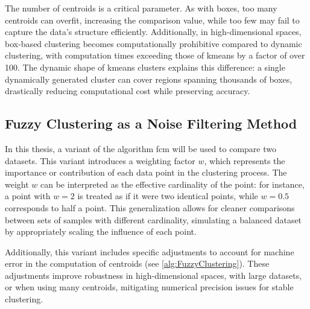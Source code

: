 \begin{toReview}
\begin{exempli_gratia}
	\noindent The number of centroids is a critical parameter. As with boxes, too many centroids can overfit, increasing the comparison value, while too few may fail to capture the data's structure efficiently. Additionally, in high-dimensional spaces, box-based clustering becomes computationally prohibitive compared to dynamic clustering, with computation times exceeding those of \gls{kmeans} by a factor of over 100. The dynamic shape of \gls{kmeans} clusters explains this difference: a single dynamically generated cluster can cover regions spanning thousands of boxes, drastically reducing computational cost while preserving accuracy.
\end{exempli_gratia}
\end{toReview}
\newpage
\subsection{Fuzzy Clustering as a Noise Filtering Method}
\begin{modified}
In this thesis, a variant of the algorithm \gls{fcm} will be used to compare two datasets. This variant introduces a weighting factor $w$, which represents the importance or contribution of each data point in the clustering process. The weight $w$ can be interpreted as the effective cardinality of the point: for instance, a point with $w=2$ is treated as if it were two identical points, while $w=0.5$ corresponds to half a point. This generalization allows for cleaner comparisons between sets of samples with different cardinality, simulating a balanced dataset by appropriately scaling the influence of each point.

\noindent Additionally, this variant includes specific adjustments to account for machine error in the computation of centroids (see \cref{alg:FuzzyClustering}). These adjustments improve robustness in high-dimensional spaces, with large datasets, or when using many centroids, mitigating numerical precision issues for stable clustering.
\end{modified}
